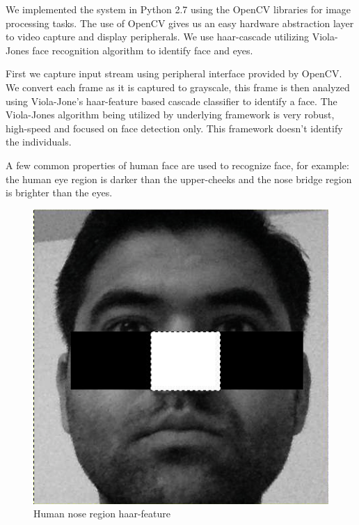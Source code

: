 \documentclass[10pt,twocolumn,letterpaper]{article}
\begin{document}
We implemented the system in Python 2.7 using the OpenCV libraries for 
image processing tasks. The use of OpenCV gives us an easy hardware 
abstraction layer to video capture and display peripherals. We use 
haar-cascade utilizing Viola-Jones face recognition algorithm to 
identify face and eyes. 

First we capture input stream using peripheral
interface provided by OpenCV. We convert each 
frame as it is captured to grayscale, this frame is then analyzed 
using Viola-Jone's haar-feature based cascade classifier to identify a face.  
The Viola-Jones algorithm being utilized by underlying framework is very robust, 
high-speed and focused on face detection only. This framework doesn't 
identify the individuals. 

A few common properties of human face are used to recognize face, for example: the human eye region is darker than the upper-cheeks and the nose bridge region is brighter than the eyes.

\begin{figure}
  \begin{center}
    \includegraphics[width=\linewidth]{nose}
  \end{center}
  \caption{Human nose region haar-feature}
  \label{fig:human_nose}
\end{figure}
\end{document}
